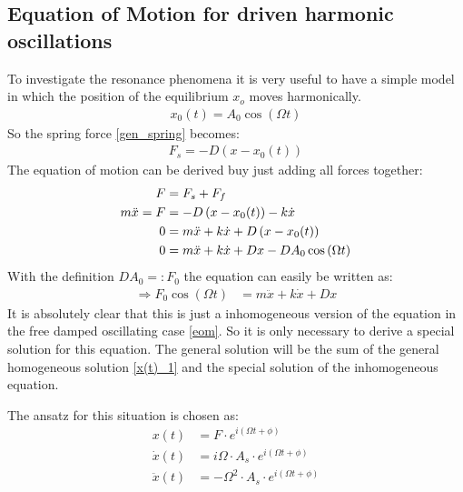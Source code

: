 \subsection{Equation of Motion for driven harmonic oscillations}
To investigate the resonance phenomena it is very useful to have a simple model in which the position of the equilibrium \(x_o\) moves harmonically.
\begin{align}
x_0(t) = A_0\cos \left( \Omega t\right)
\end{align}
So the spring force \eqref{gen_spring} becomes:
\begin{align}
F_s = -D\left(x -x_0(t) \right)
\end{align}
The equation of motion can be derived buy just adding all forces together:
\begin{align}
F &= F_s + F_f \notag\\
m \ddot{x} = F &= -D\left(x -x_0(t) \right) -k \dot{x} \notag \\
0 &= m \ddot{x}  + k \dot{x} + D\left(x -x_0(t) \right) \notag \\
0 &= m \ddot{x}  + k \dot{x} + Dx -DA_0\cos \left( \Omega t\right) \notag
\end{align}
With the definition \(DA_0 =: F_0\) the equation can easily be written as:
\begin{align}
\Rightarrow F_0 \cos \left( \Omega t \right) &= m \ddot{x} + k \dot{x} + Dx
\end{align}
It is absolutely clear that this is just a inhomogeneous version of the equation in the free damped oscillating case \eqref{eom}. So it is only necessary to derive a special solution for this equation. The general solution will be the sum of the general homogeneous solution \eqref{x(t)_1} and the special solution of the inhomogeneous equation.

The ansatz for this situation is chosen as:
\begin{align}
x(t) &= F \cdot e^{i(\Omega t + \phi)} \\
\dot{x}(t) &= i \Omega \cdot A_s \cdot e^{i(\Omega t + \phi)} \\
\ddot{x}(t) &= - \Omega^2 \cdot A_s \cdot e^{i(\Omega t + \phi)}
\end{align}